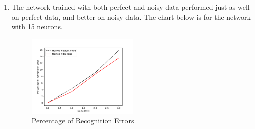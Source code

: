 \documentclass[11pt]{article}
\begin{document}
\begin{enumerate}
\begin{enumerate}
\item The network trained with both perfect and noisy data performed just as well on perfect data, and better on noisy data. The chart below is for the network with 15 neurons.\\
\begin{figure}[h!]
    \centering
     \includegraphics[width=0.5\textwidth]{q2-c}
        \caption{Percentage of Recognition Errors}
\end{figure}

\end{enumerate}

\end{enumerate}
\end{document}
